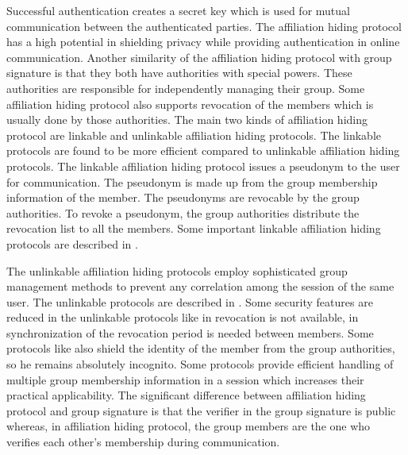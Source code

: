 Successful authentication creates a secret key which is used for mutual communication between the authenticated parties. The affiliation hiding protocol has a high potential in shielding privacy while providing authentication in online communication. Another similarity of the affiliation hiding protocol with group signature is that they both have authorities with special powers. These authorities are responsible for independently managing their group. Some affiliation hiding protocol also supports revocation of the members which is usually done by those authorities. The main two kinds of affiliation hiding protocol are linkable and unlinkable affiliation hiding protocols. The linkable protocols are found to be more efficient compared to unlinkable affiliation hiding protocols. The linkable affiliation hiding protocol issues a pseudonym to the user for communication. The pseudonym is made up from the group membership information of the member. The pseudonyms are revocable by the group authorities. To revoke a pseudonym, the group authorities distribute the revocation list to all the members. Some important linkable affiliation hiding protocols are described in \cite{balfanz2003secret, castelluccia2004secret, vergnaud2006rsa, jarecki2008beyond, manulis2011affiliation, manulis2011practical, manulis2010affiliation2}.
 
The unlinkable affiliation hiding protocols employ sophisticated group management methods to prevent any correlation among the session of the same user. The unlinkable protocols are described in \cite{ateniese2007secret, jarecki2007unlinkable, law2009private, tsudik2006flexible}. Some security features are reduced in the unlinkable protocols like in \cite{ateniese2007secret} revocation is not available, in \cite{jarecki2007unlinkable} synchronization of the revocation period is needed between members. Some protocols like \cite{manulis2010affiliation2, manulis2010taming} also shield the identity of the member from the group authorities, so he remains absolutely incognito. Some protocols provide efficient handling of multiple group membership information in a session which increases their practical applicability. The significant difference between affiliation hiding protocol and group signature is that the verifier in the group signature is public whereas, in affiliation hiding protocol, the group members are the one who verifies each other's membership during communication.

